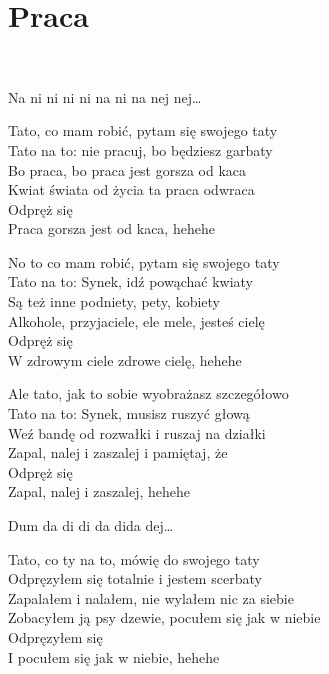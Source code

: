\documentclass[a5paper, 10pt]{book}
\begin{document}
\section{Praca}\textcolor{lightgray}{\textit{}}\\
\begin{minipage}[t]{0.8\textwidth}
Na ni ni ni ni na ni na nej nej…\vspace*{1.6mm}

Tato, co mam robić, pytam się swojego taty\\
Tato na to: nie pracuj, bo będziesz garbaty\\
Bo praca, bo praca jest gorsza od kaca\\
Kwiat świata od życia ta praca odwraca\\
\hspace*{5mm}Odpręż się\\
\hspace*{5mm}Praca gorsza jest od kaca, hehehe\vspace*{1.6mm}

No to co mam robić, pytam się swojego taty\\
Tato na to: Synek, idź powąchać kwiaty\\
Są też inne podniety, pety, kobiety\\
Alkohole, przyjaciele, ele mele, jesteś cielę\\
\hspace*{5mm}Odpręż się\\
\hspace*{5mm}W zdrowym ciele zdrowe cielę, hehehe\vspace*{1.6mm}

Ale tato, jak to sobie wyobrażasz szczegółowo\\
Tato na to: Synek, musisz ruszyć głową\\
Weź bandę od rozwałki i ruszaj na działki\\
Zapal, nalej i zaszalej i pamiętaj, że\\
\hspace*{5mm}Odpręż się\\
\hspace*{5mm}Zapal, nalej i zaszalej, hehehe\vspace*{1.6mm}

Dum da di di da dida dej…\vspace*{1.6mm}

Tato, co ty na to, mówię do swojego taty\\
Odpręzyłem się totalnie i jestem scerbaty\\
Zapalałem i nalałem, nie wylałem nic za siebie\\
Zobacyłem ją psy dzewie, pocułem się jak w niebie\\
\hspace*{5mm}Odpręzyłem się\\
\hspace*{5mm}I pocułem się jak w niebie, hehehe\vspace*{1.6mm}


\end{minipage}
\end{document}

